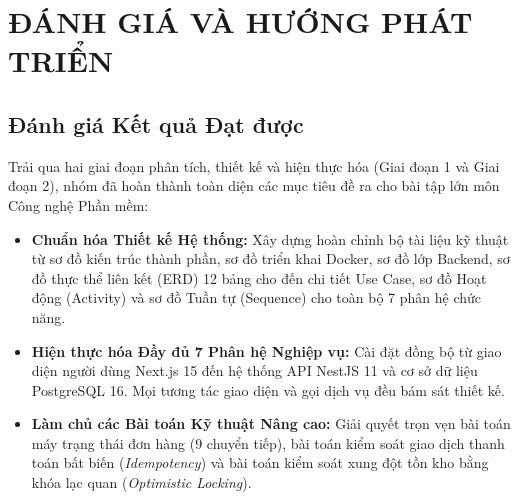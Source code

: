 \documentclass[12pt,a4paper,oneside]{report}
\begin{document}


\chapter{ĐÁNH GIÁ VÀ HƯỚNG PHÁT TRIỂN}

\section{Đánh giá Kết quả Đạt được}
Trải qua hai giai đoạn phân tích, thiết kế và hiện thực hóa (Giai đoạn 1 và Giai đoạn 2), nhóm đã hoàn thành toàn diện các mục tiêu đề ra cho bài tập lớn môn Công nghệ Phần mềm:
\begin{itemize}
    \item \textbf{Chuẩn hóa Thiết kế Hệ thống:} Xây dựng hoàn chỉnh bộ tài liệu kỹ thuật từ sơ đồ kiến trúc thành phần, sơ đồ triển khai Docker, sơ đồ lớp Backend, sơ đồ thực thể liên kết (ERD) 12 bảng cho đến chi tiết Use Case, sơ đồ Hoạt động (Activity) và sơ đồ Tuần tự (Sequence) cho toàn bộ 7 phân hệ chức năng.
    \item \textbf{Hiện thực hóa Đầy đủ 7 Phân hệ Nghiệp vụ:} Cài đặt đồng bộ từ giao diện người dùng Next.js 15 đến hệ thống API NestJS 11 và cơ sở dữ liệu PostgreSQL 16. Mọi tương tác giao diện và gọi dịch vụ đều bám sát thiết kế.
    \item \textbf{Làm chủ các Bài toán Kỹ thuật Nâng cao:} Giải quyết trọn vẹn bài toán máy trạng thái đơn hàng (9 chuyển tiếp), bài toán kiểm soát giao dịch thanh toán bất biến (\textit{Idempotency}) và bài toán kiểm soát xung đột tồn kho bằng khóa lạc quan (\textit{Optimistic Locking}).
\end{itemize}
\end{document}
